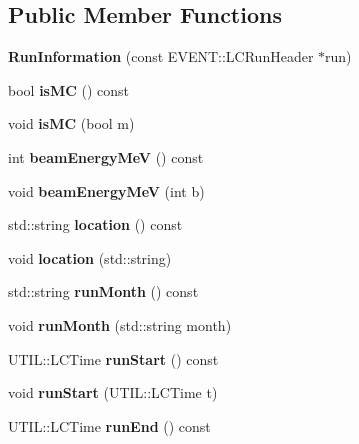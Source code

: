 \subsection*{Public Member Functions}
\begin{DoxyCompactItemize}
\item 
{\bfseries Run\-Information} (const E\-V\-E\-N\-T\-::\-L\-C\-Run\-Header $\ast$run)\label{classRunInformation_a03368256e5d800b58b63d82300a70f74}

\item 
bool {\bfseries is\-M\-C} () const \label{classRunInformation_abcb9533465cb06b0b38a1f586da3b4c6}

\item 
void {\bfseries is\-M\-C} (bool m)\label{classRunInformation_a1a244eb9e74b9aa7238218fc13b5bfaa}

\item 
int {\bfseries beam\-Energy\-Me\-V} () const \label{classRunInformation_a77e4bfff69ddd5fd39b9e2aa1f9864a4}

\item 
void {\bfseries beam\-Energy\-Me\-V} (int b)\label{classRunInformation_a55ee38b3ff72be26ad066847c31eee94}

\item 
std\-::string {\bfseries location} () const \label{classRunInformation_ad16df67de202576fb965305a32a0127a}

\item 
void {\bfseries location} (std\-::string)\label{classRunInformation_a77e67b37e35ecdda241305347d1ca267}

\item 
std\-::string {\bfseries run\-Month} () const \label{classRunInformation_a106a787de2ea90af01adc7d18ada359a}

\item 
void {\bfseries run\-Month} (std\-::string month)\label{classRunInformation_ad7fb33e94ebc671255a2263e13e18564}

\item 
U\-T\-I\-L\-::\-L\-C\-Time {\bfseries run\-Start} () const \label{classRunInformation_a92794be1db82086ba339271c4e5d9ea0}

\item 
void {\bfseries run\-Start} (U\-T\-I\-L\-::\-L\-C\-Time t)\label{classRunInformation_ab5035e9e7619a0bf5efd4bf99760bd80}

\item 
U\-T\-I\-L\-::\-L\-C\-Time {\bfseries run\-End} () const \label{classRunInformation_a178fffe32671265948cb8982f661f3d6}


\end{DoxyCompactItemize}
